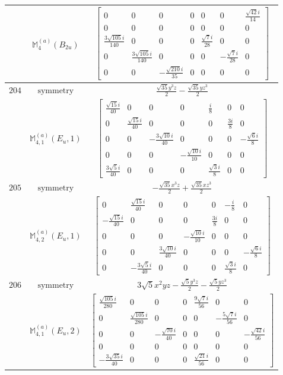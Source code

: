 \documentclass[fleqn,8pt,landscape]{jsarticle}
\begin{document}
\begin{longtable}{ccc}
$  $ & $ \mathbb{M}_{4}^{(a)}(B_{2u}) $ & $ \begin{bmatrix} 0 & 0 & 0 & 0 & 0 & 0 & \frac{\sqrt{42} i}{14} \\ 0 & 0 & 0 & 0 & 0 & 0 & 0 \\ \frac{3 \sqrt{105} i}{140} & 0 & 0 & 0 & \frac{\sqrt{7} i}{28} & 0 & 0 \\ 0 & \frac{3 \sqrt{105} i}{140} & 0 & 0 & 0 & - \frac{\sqrt{7} i}{28} & 0 \\ 0 & 0 & - \frac{\sqrt{210} i}{35} & 0 & 0 & 0 & 0 \end{bmatrix} $ \\ \hline
$ 204 $ & $ \text{symmetry} $ & $ \frac{\sqrt{35} y^{3} z}{2} - \frac{\sqrt{35} y z^{3}}{2} $ \\
$  $ & $ \mathbb{M}_{4,1}^{(a)}(E_{u},1) $ & $ \begin{bmatrix} \frac{\sqrt{15} i}{40} & 0 & 0 & 0 & \frac{i}{8} & 0 & 0 \\ 0 & \frac{\sqrt{15} i}{40} & 0 & 0 & 0 & \frac{3 i}{8} & 0 \\ 0 & 0 & - \frac{3 \sqrt{10} i}{40} & 0 & 0 & 0 & - \frac{\sqrt{6} i}{8} \\ 0 & 0 & 0 & - \frac{\sqrt{10} i}{10} & 0 & 0 & 0 \\ \frac{3 \sqrt{5} i}{40} & 0 & 0 & 0 & \frac{\sqrt{3} i}{8} & 0 & 0 \end{bmatrix} $ \\ \hline
$ 205 $ & $ \text{symmetry} $ & $ - \frac{\sqrt{35} x^{3} z}{2} + \frac{\sqrt{35} x z^{3}}{2} $ \\
$  $ & $ \mathbb{M}_{4,2}^{(a)}(E_{u},1) $ & $ \begin{bmatrix} 0 & \frac{\sqrt{15} i}{40} & 0 & 0 & 0 & - \frac{i}{8} & 0 \\ - \frac{\sqrt{15} i}{40} & 0 & 0 & 0 & \frac{3 i}{8} & 0 & 0 \\ 0 & 0 & 0 & - \frac{\sqrt{10} i}{10} & 0 & 0 & 0 \\ 0 & 0 & \frac{3 \sqrt{10} i}{40} & 0 & 0 & 0 & - \frac{\sqrt{6} i}{8} \\ 0 & - \frac{3 \sqrt{5} i}{40} & 0 & 0 & 0 & \frac{\sqrt{3} i}{8} & 0 \end{bmatrix} $ \\ \hline
$ 206 $ & $ \text{symmetry} $ & $ 3 \sqrt{5} x^{2} y z - \frac{\sqrt{5} y^{3} z}{2} - \frac{\sqrt{5} y z^{3}}{2} $ \\
$  $ & $ \mathbb{M}_{4,1}^{(a)}(E_{u},2) $ & $ \begin{bmatrix} \frac{\sqrt{105} i}{280} & 0 & 0 & 0 & \frac{9 \sqrt{7} i}{56} & 0 & 0 \\ 0 & \frac{\sqrt{105} i}{280} & 0 & 0 & 0 & - \frac{5 \sqrt{7} i}{56} & 0 \\ 0 & 0 & - \frac{\sqrt{70} i}{40} & 0 & 0 & 0 & - \frac{\sqrt{42} i}{56} \\ 0 & 0 & 0 & 0 & 0 & 0 & 0 \\ - \frac{3 \sqrt{35} i}{40} & 0 & 0 & 0 & \frac{\sqrt{21} i}{56} & 0 & 0 \end{bmatrix} $ \\ \hline

\end{longtable}
\end{document}
